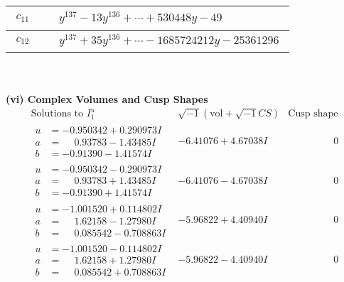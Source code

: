 \documentclass[1p]{elsarticle_modified}
\theoremstyle{definition}
\newcommand{\I}{\sqrt{-1}}
\begin{document}
\begin{tabular}{m{50pt}|m{274pt}}
\hline $$\begin{aligned}c_{11}\end{aligned}$$&$\begin{aligned}
&y^{137}-13 y^{136}+\cdots+530448 y-49
\end{aligned}$\\
\hline $$\begin{aligned}c_{12}\end{aligned}$$&$\begin{aligned}
&y^{137}+35 y^{136}+\cdots-1685724212 y-25361296
\end{aligned}$\\
\hline
\end{tabular}\\~\\
\newpage\flushleft \textbf{(vi) Complex Volumes and Cusp Shapes}
$$\begin{array}{c|c|c}  
\text{Solutions to }I^u_{1}& \I (\text{vol} + \sqrt{-1}CS) & \text{Cusp shape}\\
 \hline 
\begin{aligned}
u &= -0.950342 + 0.290973 I \\
a &= \phantom{-}0.93783 - 1.43485 I \\
b &= -0.91390 - 1.41574 I\end{aligned}
 & -6.41076 + 4.67038 I & \phantom{-0.000000 } 0 \\ \hline\begin{aligned}
u &= -0.950342 - 0.290973 I \\
a &= \phantom{-}0.93783 + 1.43485 I \\
b &= -0.91390 + 1.41574 I\end{aligned}
 & -6.41076 - 4.67038 I & \phantom{-0.000000 } 0 \\ \hline\begin{aligned}
u &= -1.001520 + 0.114802 I \\
a &= \phantom{-}1.62158 - 1.27980 I \\
b &= \phantom{-}0.085542 - 0.708863 I\end{aligned}
 & -5.96822 + 4.40940 I & \phantom{-0.000000 } 0 \\ \hline\begin{aligned}
u &= -1.001520 - 0.114802 I \\
a &= \phantom{-}1.62158 + 1.27980 I \\
b &= \phantom{-}0.085542 + 0.708863 I\end{aligned}
 & -5.96822 - 4.40940 I & \phantom{-0.000000 } 0 \\ \hline\begin{aligned}

\end{aligned}
\end{array}$$
\end{document}
